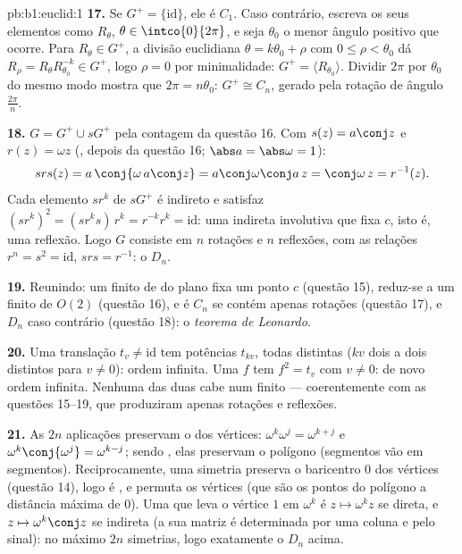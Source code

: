 \begin{solution}{pb:b1:euclid:1}
\textbf{17.} Se $G^{+} = \{\mathrm{id}\}$, ele é $C_1$. Caso contrário, escreva os seus
elementos como $R_\theta$, $\theta \in
\intco{0}{2\pi}$, e seja $\theta_0$ o menor ângulo positivo
que ocorre. Para $R_\theta \in G^{+}$, a divisão euclidiana $\theta = k\theta_0 + \rho$ com $0 \leq \rho < \theta_0$ dá
$R_\rho = R_\theta R_{\theta_0}^{-k} \in G^{+}$, logo $\rho = 0$ por minimalidade: $G^{+} = \langle R_{\theta_0}\rangle$. Dividir $2\pi$ por $\theta_0$
do mesmo modo mostra que $2\pi = n\theta_0$: $G^{+} \cong C_n$, gerado pela rotação de
ângulo $\frac{2\pi}n$.

\textbf{18.} $G = G^{+} \cup sG^{+}$ pela contagem da questão 16. Com $s(z) = a\conj z$ e $r(z) = \omega z$
(, depois da questão 16; $\abs a = \abs\omega = 1$):
\[
s r s(z) = a\,\conj{\omega\,a\conj z}
= a\conj\omega\conj a\,z = \conj\omega\,z = r^{-1}(z) .
\]
Cada elemento $sr^k$ de $sG^{+}$ é indireto e satisfaz $(sr^k)^2 = (sr^ks)\,r^k = r^{-k}r^k = \mathrm{id}$: uma
 indireta involutiva que fixa $c$, isto é, uma reflexão.
Logo $G$ consiste em $n$ rotações e $n$ reflexões, com as relações
$r^n = s^2 = \mathrm{id}$, $srs = r^{-1}$: o  $D_n$.

\textbf{19.} Reunindo: um  finito de  do plano fixa
um ponto $c$ (questão 15), reduz-se a um  finito de $O(2)$
(questão 16), e é $C_n$ se contém apenas rotações (questão 17), e
$D_n$ caso contrário (questão 18): o \emph{teorema de Leonardo}.

\textbf{20.} Uma translação $t_v \neq \mathrm{id}$ tem potências $t_{kv}$, todas
distintas ($kv$ dois a dois distintos para $v \neq 0$): ordem infinita.
Uma  $f$ tem $f^2 = t_v$ com $v
\neq 0$: de novo ordem
infinita. Nenhuma das duas cabe num  finito --- coerentemente
com as questões 15--19, que produziram apenas rotações e reflexões.

\textbf{21.} As $2n$ aplicações preservam o  dos vértices:
$\omega^k
\omega^j = \omega^{k+j}$ e $\omega^k\conj{\omega^j} =
\omega^{k-j}$; sendo , elas preservam o polígono
(segmentos vão em segmentos). Reciprocamente, uma simetria preserva
o baricentro $0$ dos vértices (questão 14), logo é , e permuta
os vértices (que são os pontos do polígono a distância máxima de
$0$). Uma   que leva o vértice $1$ em $\omega^k$ é $z \mapsto \omega^k z$
se direta, e $z \mapsto \omega^k\conj z$ se indireta (a sua matriz é determinada por uma
coluna e pelo sinal): no máximo $2n$ simetrias, logo exatamente o
$D_n$ acima.


\end{solution}
